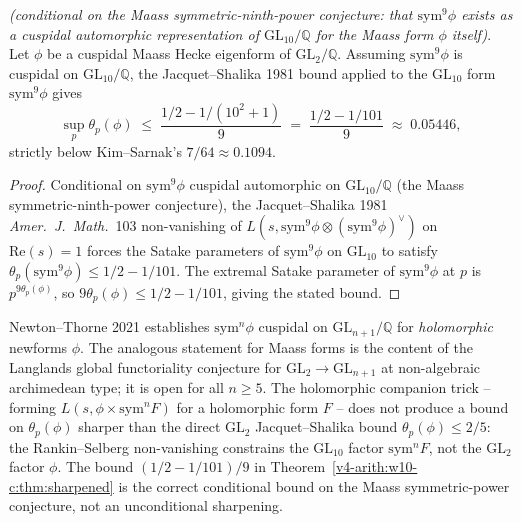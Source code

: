 \begin{theorem}
\label{v4-arith:w10-c:thm:sharpened}
\emph{(conditional on the Maass symmetric-ninth-power
conjecture: that \(\mathrm{sym}^{9}\phi\) exists as a cuspidal automorphic
representation of \(\mathrm{GL}_{10}/\mathbb{Q}\) for the Maass form \(\phi\)
itself)}. Let \(\phi\) be a cuspidal Maass Hecke eigenform of
\(\mathrm{GL}_{2}/\mathbb{Q}\). Assuming \(\mathrm{sym}^{9}\phi\) is
cuspidal on \(\mathrm{GL}_{10}/\mathbb{Q}\), the Jacquet--Shalika 1981
bound applied to the \(\mathrm{GL}_{10}\) form \(\mathrm{sym}^{9}\phi\)
gives
\begin{equation}
\label{v4-arith:w10-c:eq:sharpened-final}
\sup_{p}\theta_{p}(\phi)
\;\leq\;\frac{1/2-1/(10^{2}+1)}{9}
\;=\;\frac{1/2-1/101}{9}
\;\approx\;0.05446,
\end{equation}
strictly below Kim--Sarnak's \(7/64\approx 0.1094\).
\end{theorem}

\begin{proof}
Conditional on \(\mathrm{sym}^{9}\phi\) cuspidal automorphic on
\(\mathrm{GL}_{10}/\mathbb{Q}\) (the Maass symmetric-ninth-power conjecture),
the Jacquet--Shalika 1981 \emph{Amer.~J.~Math.}~103 non-vanishing of
\(L(s,\mathrm{sym}^{9}\phi\otimes(\mathrm{sym}^{9}\phi)^{\vee})\) on
\(\mathrm{Re}(s)=1\) forces the Satake parameters of \(\mathrm{sym}^{9}\phi\)
on \(\mathrm{GL}_{10}\) to satisfy
\(\theta_{p}(\mathrm{sym}^{9}\phi)\leq 1/2-1/101\).
The extremal Satake parameter of \(\mathrm{sym}^{9}\phi\) at \(p\) is
\(p^{9\theta_{p}(\phi)}\), so \(9\theta_{p}(\phi)\leq 1/2-1/101\), giving
the stated bound.
\end{proof}

\begin{remark}
\label{v4-arith:w10-c:rem:construction-C-quality}
Newton--Thorne 2021 establishes \(\mathrm{sym}^{n}\phi\) cuspidal on
\(\mathrm{GL}_{n+1}/\mathbb{Q}\) for \emph{holomorphic} newforms \(\phi\).
The analogous statement for Maass forms is the content of the Langlands
global functoriality conjecture for \(\mathrm{GL}_{2}\to\mathrm{GL}_{n+1}\)
at non-algebraic archimedean type; it is open for all \(n\geq 5\).
The holomorphic companion trick -- forming \(L(s,\phi\times\mathrm{sym}^{n}F)\)
for a holomorphic form \(F\) -- does not produce a bound on
\(\theta_{p}(\phi)\) sharper than the direct \(\mathrm{GL}_{2}\)
Jacquet--Shalika bound \(\theta_{p}(\phi)\leq 2/5\): the
Rankin--Selberg non-vanishing constrains the \(\mathrm{GL}_{10}\) factor
\(\mathrm{sym}^{n}F\), not the \(\mathrm{GL}_{2}\) factor \(\phi\).
The bound \((1/2-1/101)/9\) in Theorem~\ref{v4-arith:w10-c:thm:sharpened} is the
correct conditional bound on the Maass symmetric-power conjecture,
not an unconditional sharpening.
\end{remark}


